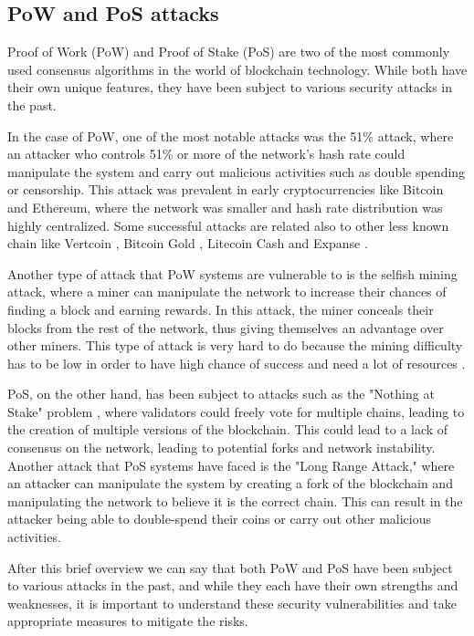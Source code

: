 \documentclass[target=mst,aauheader=]{thud}
\begin{document}
    \subsection{PoW and PoS attacks}

    Proof of Work (PoW) and Proof of Stake (PoS) are two of the most commonly used consensus algorithms in the world of blockchain technology. While both have their own unique features, they have been subject to various security attacks in the past.

    In the case of PoW, one of the most notable attacks was the 51\% attack, where an attacker who controls 51\% or more of the network's hash rate could manipulate the system and carry out malicious activities such as double spending or censorship. This attack was prevalent in early cryptocurrencies like Bitcoin and Ethereum, where the network was smaller and hash rate distribution was highly centralized. Some successful attacks are related also to other less known chain like Vertcoin \cite{VTC51Attack}, Bitcoin Gold \cite{BTCG51Attack}, Litecoin Cash \cite{LCC51Attack} and Expanse \cite{EXP51Attack}.

    Another type of attack that PoW systems are vulnerable to is the selfish mining attack, where a miner can manipulate the network to increase their chances of finding a block and earning rewards. In this attack, the miner conceals their blocks from the rest of the network, thus giving themselves an advantage over other miners. This type of attack is very hard to do because the mining difficulty has to be low in order to have high chance of success and need a lot of resources \cite{SelfishMiningDefinition}.

    PoS, on the other hand, has been subject to attacks such as the "Nothing at Stake" problem \cite{NothingAtStake}, where validators could freely vote for multiple chains, leading to the creation of multiple versions of the blockchain. This could lead to a lack of consensus on the network, leading to potential forks and network instability.
    Another attack that PoS systems have faced is the "Long Range Attack," \cite{LongRangeAttack} where an attacker can manipulate the system by creating a fork of the blockchain and manipulating the network to believe it is the correct chain. This can result in the attacker being able to double-spend their coins or carry out other malicious activities.

    After this brief overview we can say that both PoW and PoS have been subject to various attacks in the past, and while they each have their own strengths and weaknesses, it is important to understand these security vulnerabilities and take appropriate measures to mitigate the risks.
\end{document}
